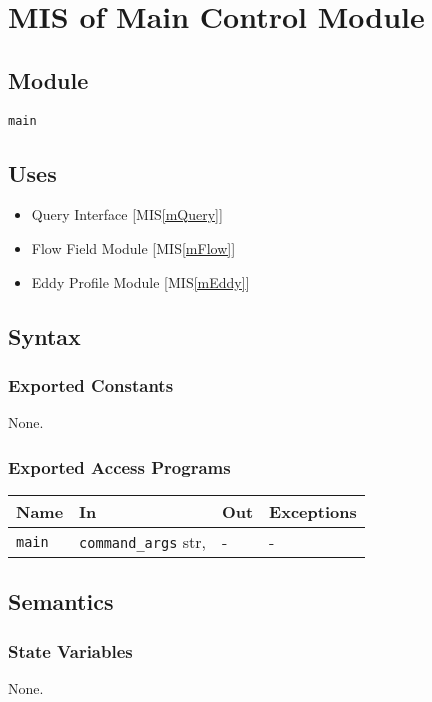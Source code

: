 \documentclass[12pt, titlepage]{article}
\begin{document}
\newpage
\section{MIS of Main Control Module} \label{mMain} 

\subsection{Module}
\texttt{main}

\subsection{Uses}
\begin{itemize}
\item Query Interface [MIS\ref{mQuery}]
\item Flow Field Module [MIS\ref{mFlow}]
\item Eddy Profile Module [MIS\ref{mEddy}]
\end{itemize}

\subsection{Syntax}

\subsubsection{Exported Constants}
None.

\subsubsection{Exported Access Programs}

\begin{center}
\begin{tabular}{p{2cm} p{5.6cm} p{3cm} p{2cm}}
\hline
\textbf{Name} & \textbf{In} & \textbf{Out} & \textbf{Exceptions} \\
\hline
\texttt{main} & \texttt{command\_args} str, & - & - \\
\hline
\end{tabular}
\end{center}

\subsection{Semantics}

\subsubsection{State Variables}
None.
\end{document}
